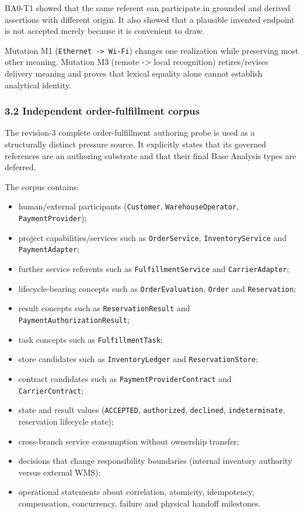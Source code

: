 \documentclass[
]{article}
\providecommand{\tightlist}{%
  \setlength{\itemsep}{0pt}\setlength{\parskip}{0pt}}
\begin{document}
BA0-T1 showed that the same referent can participate in grounded and
derived assertions with different origin. It also showed that a
plausible invented endpoint is not accepted merely because it is
convenient to draw.

Mutation M1 (\texttt{Ethernet\ -\textgreater{}\ Wi-Fi}) changes one
realization while preserving most other meaning. Mutation M3 (remote
-\textgreater{} local recognition) retires/revises delivery meaning and
proves that lexical equality alone cannot establish analytical identity.

\subsubsection{3.2 Independent order-fulfillment
corpus}\label{32-independent-order-fulfillment-corpus}

The revision-3 complete order-fulfillment authoring probe is used as a
structurally distinct pressure source. It explicitly states that its
governed references are an authoring substrate and that their final Base
Analysis types are deferred.

The corpus contains:

\begin{itemize}
\tightlist
\item
  human/external participants (\texttt{Customer},
  \texttt{WarehouseOperator}, \texttt{PaymentProvider});
\item
  project capabilities/services such as \texttt{OrderService},
  \texttt{InventoryService} and \texttt{PaymentAdapter};
\item
  further service referents such as \texttt{FulfillmentService} and
  \texttt{CarrierAdapter};
\item
  lifecycle-bearing concepts such as \texttt{OrderEvaluation},
  \texttt{Order} and \texttt{Reservation};
\item
  result concepts such as \texttt{ReservationResult} and
  \texttt{PaymentAuthorizationResult};
\item
  task concepts such as \texttt{FulfillmentTask};
\item
  store candidates such as \texttt{InventoryLedger} and
  \texttt{ReservationStore};
\item
  contract candidates such as \texttt{PaymentProviderContract} and
  \texttt{CarrierContract};
\item
  state and result values (\texttt{ACCEPTED}, \texttt{authorized},
  \texttt{declined}, \texttt{indeterminate}, reservation lifecycle
  state);
\item
  cross-branch service consumption without ownership transfer;
\item
  decisions that change responsibility boundaries (internal inventory
  authority versus external WMS);
\item
  operational statements about correlation, atomicity, idempotency,
  compensation, concurrency, failure and physical handoff milestones.
\end{itemize}
\end{document}
